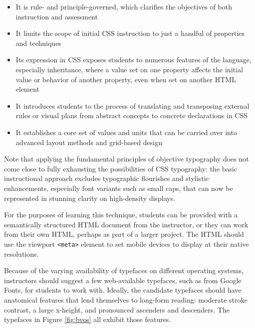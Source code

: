 \documentclass[sigconf,sigplan,review,anonymous]{acmart}
\begin{document}
\begin{itemize}
  \item It is rule- and principle-governed, which clarifies the objectives of both instruction and assessment
  \item It limits the scope of initial CSS instruction to just a handful of properties and techniques
  \item Its expression in CSS exposes students to numerous features of the language, especially inheritance, where a value set on one property affects the initial value or behavior of another property, even when set on another HTML element
  \item It introduces students to the process of translating and transposing external rules or visual plans from abstract concepts to concrete declarations in CSS
  \item It establishes a core set of values and units that can be carried over into advanced layout methods and grid-based design
\end{itemize}

Note that applying the fundamental principles of objective typography does not come close to fully exhausting the possibilities of CSS typography: the basic instructional approach excludes typographic flourishes and stylistic enhancements, especially font variants such as small caps, that can now be represented in stunning clarity on high-density displays.

For the purposes of learning this technique, students can be provided with a semantically structured HTML document from the instructor, or they can work from their own HTML, perhaps as part of a larger project. The HTML should use the viewport \verb|<meta>| element to set mobile devices to display at their native resolutions.

Because of the varying availability of typefaces on different operating systems, instructors should suggest a few web-available typefaces, such as from Google Fonts, for students to work with. Ideally, the candidate typefaces should have anatomical features that lend themselves to long-form reading: moderate stroke contrast, a large x-height, and pronounced ascenders and descenders. The typefaces in Figure \ref{fig:bvos} all exhibit those features.
\end{document}

